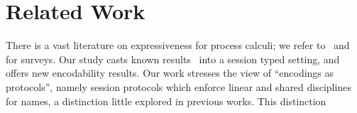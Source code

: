 \documentclass[preprint,11pt]{elsarticle}
\begin{document}
{{




\section{Related Work}
\label{sec:relwork}
%

%
There is a vast literature on expressiveness for process calculi; we refer to~\cite{DBLP:journals/entcs/Parrow08} 
and \cite[\S\,2.3]{PerezPhD10} for surveys.
Our study casts known results~\cite{SangiorgiD:expmpa} into a session typed setting, and
offers new encodability results.
Our work stresses the 
view of ``encodings as protocols'', namely session protocols which
enforce linear and shared disciplines for names, a distinction
little explored in %
previous works.
This distinction %
}}
\end{document}
